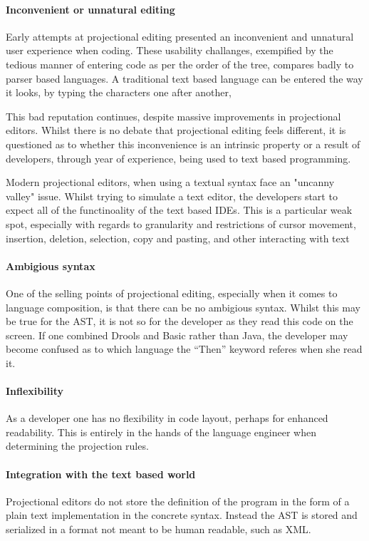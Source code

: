 \paragraph{Inconvenient or unnatural editing}
Early attempts at projectional editing presented an inconvenient and unnatural user experience when coding.
These usability challanges, exempified by the tedious manner of entering code as per the order of the tree, compares badly to parser based languages.
A traditional text based language can be entered the way it looks, by typing the characters one after another,

This bad reputation continues, despite massive improvements in projectional editors.
Whilst there is no debate that projectional editing feels different, it is questioned as to whether this inconvenience is an intrinsic property or a result of developers, through year of experience, being used to text based programming. 

Modern projectional editors, when using a textual syntax face an "uncanny valley" issue.
Whilst trying to simulate a text editor, the developers start to expect all of the functinoality of the text based IDEs.
This is a particular weak spot, especially with regards to granularity and restrictions of cursor movement, insertion, deletion, selection, copy and pasting, and other interacting with text

\paragraph{Ambigious syntax}
One of the selling points of projectional editing, especially when it comes to language composition, is that there can be no ambigious syntax.
Whilst this may be true for the AST, it is not so for the developer as they read this code on the screen.
If one combined Drools and Basic rather than Java, the developer may become confused as to which language the ``Then'' keyword referes when she read it.

\paragraph{Inflexibility}
As a developer one has no flexibility in code layout, perhaps for enhanced readability. 
This is entirely in the hands of the language engineer when determining the projection rules.

\paragraph{Integration with the text based world}
Projectional editors do not store the definition of the program in the form of a plain text implementation in the concrete syntax.
Instead the AST is stored and serialized in a format not meant to be human readable, such as XML.

